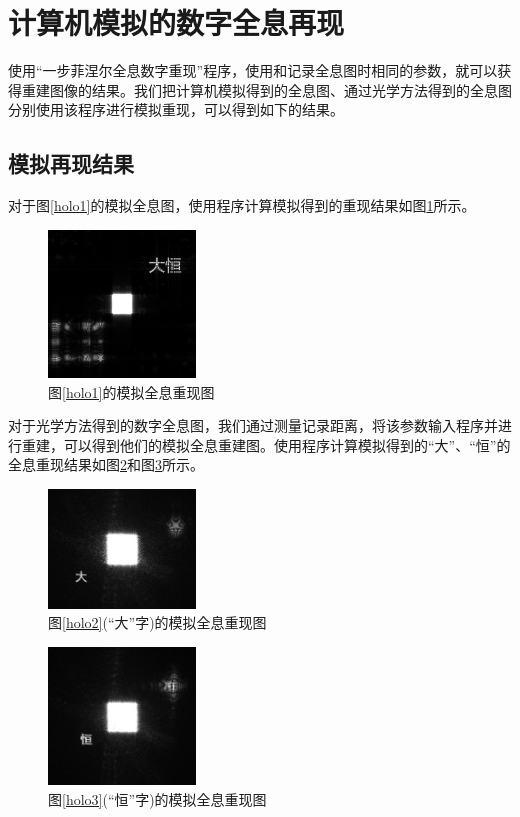 \documentclass[10pt,a4paper,twocolumn,twoside,UTF8]{ctexart}
\begin{document}
	\section{计算机模拟的数字全息再现}
		使用“一步菲涅尔全息数字重现”程序，使用和记录全息图时相同的参数，就可以获得重建图像的结果。我们把计算机模拟得到的全息图、通过光学方法得到的全息图分别使用该程序进行模拟重现，可以得到如下的结果。

		\subsection{模拟再现结果}
		对于图\ref{holo1}的模拟全息图，使用程序计算模拟得到的重现结果如图\ref{holorel1}所示。

		\begin{figure}[H]
			\centering
			\includegraphics[width=0.35\textwidth]{img//1.3.jpg}
			\caption{图\ref{holo1}的模拟全息重现图}
			\label{holorel1}
		\end{figure}

		对于光学方法得到的数字全息图，我们通过测量记录距离，将该参数输入程序并进行重建，可以得到他们的模拟全息重建图。使用程序计算模拟得到的“大”、“恒”的全息重现结果如图\ref{holorel2}和图\ref{holorel3}所示。
		\begin{figure}[H]
			\centering
			\includegraphics[width=0.35\textwidth]{img//2.5.3.1.jpg}
			\caption{图\ref{holo2}(“大”字)的模拟全息重现图}
			\label{holorel2}
		\end{figure}

		\begin{figure}[H]
			\centering
			\includegraphics[width=0.35\textwidth]{img//2.4.7.1.jpg}
			\caption{图\ref{holo3}(“恒”字)的模拟全息重现图}
			\label{holorel3}
		\end{figure}
\end{document}
